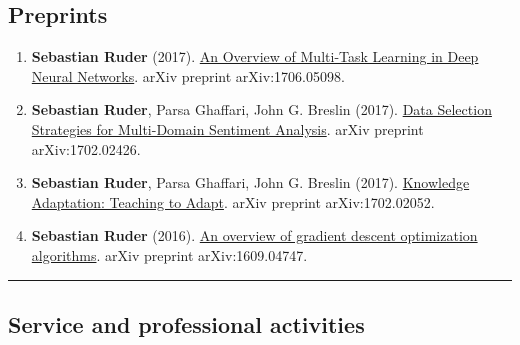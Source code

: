 \documentclass[10pt,letterpaper]{article}
\begin{document}
\subsection*{Preprints}
\begin{enumerate}
	\parskip=0.1em
	\setcounter{enumi}{16}
	
	\item \textbf{Sebastian Ruder} (2017). \href{https://arxiv.org/abs/1706.05098}{An Overview of Multi-Task Learning in Deep Neural Networks}. arXiv preprint arXiv:1706.05098.
	
	\item \textbf{Sebastian Ruder}, Parsa Ghaffari, John G. Breslin (2017). \href{https://arxiv.org/abs/1702.02426}{Data Selection Strategies for Multi-Domain Sentiment Analysis}. arXiv preprint arXiv:1702.02426.
	
	\item \textbf{Sebastian Ruder}, Parsa Ghaffari, John G. Breslin (2017). \href{https://arxiv.org/abs/1702.02052}{Knowledge Adaptation: Teaching to Adapt}. arXiv preprint arXiv:1702.02052.
	
	\item \textbf{Sebastian Ruder} (2016). \href{https://arxiv.org/pdf/1609.04747.pdf}{An overview of gradient descent optimization algorithms}. arXiv preprint arXiv:1609.04747.

\end{enumerate}

\hrule
\vspace{-0.4em}
\subsection*{Service and professional activities}
\end{document}
